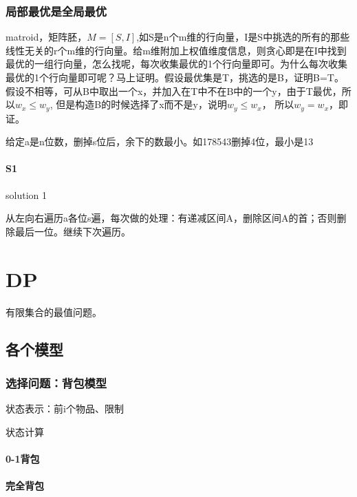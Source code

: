 \documentclass[UTF8]{../computerUniverse}
\begin{document}
\subsubsection{局部最优是全局最优}

matroid，矩阵胚，$M = [S,I]$,如S是n个m维的行向量，I是S中挑选的所有的那些线性无关的r个m维的行向量。给m维附加上权值维度信息，则贪心即是在I中找到最优的一组行向量，怎么找呢，每次收集最优的1个行向量即可。为什么每次收集最优的1个行向量即可呢？马上证明。假设最优集是T，挑选的是B，证明B=T。假设不相等，可从B中取出一个x，并加入在T中不在B中的一个y，由于T最优，所以$w_x \leqslant w_y$, 但是构造B的时候选择了x而不是y，说明$w_y \leqslant w_x$， 所以$w_y = w_x$，即证。


\begin{question}
  给定a是n位数，删掉s位后，余下的数最小。如178543删掉4位，最小是13
 
   \paragraph{S1} solution 1

   从左向右遍历a各位s遍，每次做的处理：有递减区间A，删除区间A的首；否则删除最后一位。继续下次遍历。

 
 \end{question}




\section{DP}
有限集合的最值问题。





\subsection{各个模型}

\subsubsection{选择问题：背包模型}

状态表示：前i个物品、限制

状态计算


\paragraph{0-1背包}
\paragraph{完全背包}
\end{document}
